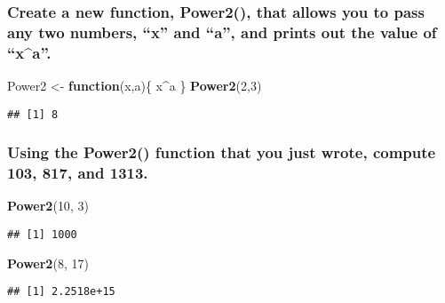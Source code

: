 \documentclass[]{article}
\newenvironment{Shaded}{\begin{snugshade}}{\end{snugshade}}
\newcommand{\KeywordTok}[1]{\textcolor[rgb]{0.13,0.29,0.53}{\textbf{#1}}}
\newcommand{\DecValTok}[1]{\textcolor[rgb]{0.00,0.00,0.81}{#1}}
\newcommand{\StringTok}[1]{\textcolor[rgb]{0.31,0.60,0.02}{#1}}
\newcommand{\ControlFlowTok}[1]{\textcolor[rgb]{0.13,0.29,0.53}{\textbf{#1}}}
\newcommand{\OperatorTok}[1]{\textcolor[rgb]{0.81,0.36,0.00}{\textbf{#1}}}
\newcommand{\NormalTok}[1]{#1}
\begin{document}
\subsubsection{\texorpdfstring{Create a new function, Power2(), that
allows you to pass any two numbers, ``x'' and ``a'', and prints out the
value of
``x\^{}a''.}{Create a new function, Power2(), that allows you to pass any two numbers, x and a, and prints out the value of x\^{}a.}}\label{create-a-new-function-power2-that-allows-you-to-pass-any-two-numbers-x-and-a-and-prints-out-the-value-of-xa.}

\begin{Shaded}
\begin{Highlighting}[]
\NormalTok{Power2 <-}\StringTok{ }\ControlFlowTok{function}\NormalTok{(x,a)\{}
\NormalTok{  x}\OperatorTok{^}\NormalTok{a}
\NormalTok{\}}
\KeywordTok{Power2}\NormalTok{(}\DecValTok{2}\NormalTok{,}\DecValTok{3}\NormalTok{)}
\end{Highlighting}
\end{Shaded}

\begin{verbatim}
## [1] 8
\end{verbatim}

\subsubsection{Using the Power2() function that you just wrote, compute
103, 817, and
1313.}\label{using-the-power2-function-that-you-just-wrote-compute-103-817-and-1313.}

\begin{Shaded}
\begin{Highlighting}[]
\KeywordTok{Power2}\NormalTok{(}\DecValTok{10}\NormalTok{, }\DecValTok{3}\NormalTok{)}
\end{Highlighting}
\end{Shaded}

\begin{verbatim}
## [1] 1000
\end{verbatim}

\begin{Shaded}
\begin{Highlighting}[]
\KeywordTok{Power2}\NormalTok{(}\DecValTok{8}\NormalTok{, }\DecValTok{17}\NormalTok{)}
\end{Highlighting}
\end{Shaded}

\begin{verbatim}
## [1] 2.2518e+15
\end{verbatim}
\end{document}
